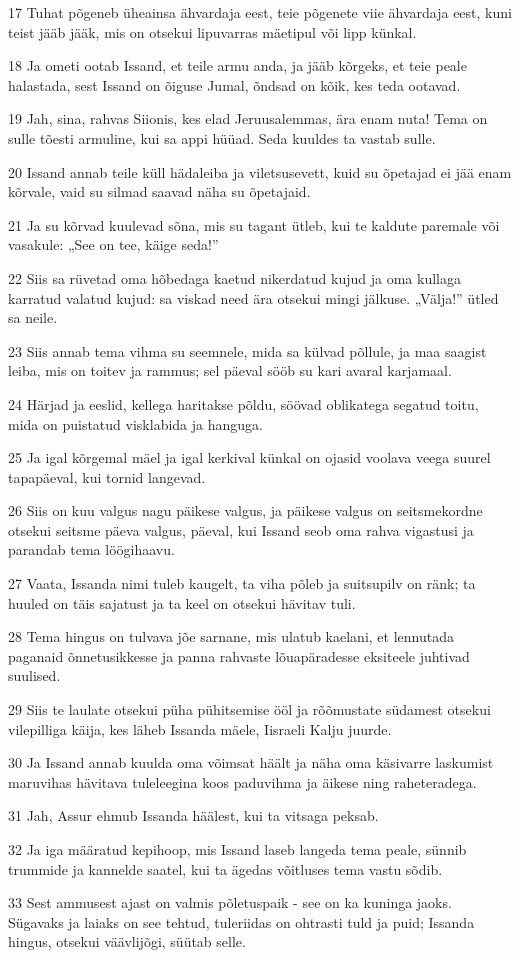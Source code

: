 \par 17 Tuhat põgeneb üheainsa ähvardaja eest, teie põgenete viie ähvardaja eest, kuni teist jääb jääk, mis on otsekui lipuvarras mäetipul või lipp künkal.
\par 18 Ja ometi ootab Issand, et teile armu anda, ja jääb kõrgeks, et teie peale halastada, sest Issand on õiguse Jumal, õndsad on kõik, kes teda ootavad.
\par 19 Jah, sina, rahvas Siionis, kes elad Jeruusalemmas, ära enam nuta! Tema on sulle tõesti armuline, kui sa appi hüüad. Seda kuuldes ta vastab sulle.
\par 20 Issand annab teile küll hädaleiba ja viletsusevett, kuid su õpetajad ei jää enam kõrvale, vaid su silmad saavad näha su õpetajaid.
\par 21 Ja su kõrvad kuulevad sõna, mis su tagant ütleb, kui te kaldute paremale või vasakule: „See on tee, käige seda!”
\par 22 Siis sa rüvetad oma hõbedaga kaetud nikerdatud kujud ja oma kullaga karratud valatud kujud: sa viskad need ära otsekui mingi jälkuse. „Välja!” ütled sa neile.
\par 23 Siis annab tema vihma su seemnele, mida sa külvad põllule, ja maa saagist leiba, mis on toitev ja rammus; sel päeval sööb su kari avaral karjamaal.
\par 24 Härjad ja eeslid, kellega haritakse põldu, söövad oblikatega segatud toitu, mida on puistatud visklabida ja hanguga.
\par 25 Ja igal kõrgemal mäel ja igal kerkival künkal on ojasid voolava veega suurel tapapäeval, kui tornid langevad.
\par 26 Siis on kuu valgus nagu päikese valgus, ja päikese valgus on seitsmekordne otsekui seitsme päeva valgus, päeval, kui Issand seob oma rahva vigastusi ja parandab tema löögihaavu.
\par 27 Vaata, Issanda nimi tuleb kaugelt, ta viha põleb ja suitsupilv on ränk; ta huuled on täis sajatust ja ta keel on otsekui hävitav tuli.
\par 28 Tema hingus on tulvava jõe sarnane, mis ulatub kaelani, et lennutada paganaid õnnetusikkesse ja panna rahvaste lõuapäradesse eksiteele juhtivad suulised.
\par 29 Siis te laulate otsekui püha pühitsemise ööl ja rõõmustate südamest otsekui vilepilliga käija, kes läheb Issanda mäele, Iisraeli Kalju juurde.
\par 30 Ja Issand annab kuulda oma võimsat häält ja näha oma käsivarre laskumist maruvihas hävitava tuleleegina koos paduvihma ja äikese ning raheteradega.
\par 31 Jah, Assur ehmub Issanda häälest, kui ta vitsaga peksab.
\par 32 Ja iga määratud kepihoop, mis Issand laseb langeda tema peale, sünnib trummide ja kannelde saatel, kui ta ägedas võitluses tema vastu sõdib.
\par 33 Sest ammusest ajast on valmis põletuspaik - see on ka kuninga jaoks. Sügavaks ja laiaks on see tehtud, tuleriidas on ohtrasti tuld ja puid; Issanda hingus, otsekui väävlijõgi, süütab selle.

